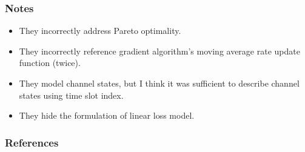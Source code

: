 \documentclass{beamer}
\begin{document}
\begin{frame}
  \frametitle{Notes}
  \begin{itemize}
    \item They incorrectly address Pareto optimality.
    \item They incorrectly reference gradient algorithm's moving average rate update function (twice).
    \item They model channel states, but I think it was sufficient to describe channel states using time slot index.
    \item They hide the formulation of linear loss model.
  \end{itemize}
\end{frame}

\begin{frame}
  \frametitle{References}
  \printbibliography[heading=none]
\end{frame}
\end{document}
